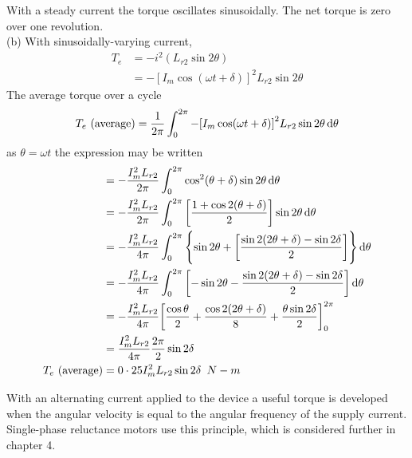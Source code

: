 \documentclass[a4paper,numbers=noenddot,12pt]{scrbook}
\begin{document}
With a steady current the torque oscillates sinusoidally. The net torque is zero over one revolution.\\
(b) With sinusoidally-varying current,
\begin{align*}
    T_e & = -i^2 (L_{r2} \sin 2 \theta) \\
    & = -{[I_m \cos (\omega t + \delta)]}^2 L_{r2} \sin 2 \theta
\end{align*}
The average torque over a cycle
\begin{equation}
    T_e\ (\text{average}) = \dfrac{1}{2 \pi} \int_0^{2 \pi} - {[I_m \cos (\omega t + \delta)]}^2 L_{r2} \sin 2\theta \dif \theta
    \label{eq:Eq3.44}
\end{equation}
as $\theta = \omega t$ the expression may be written
\begin{align}
    & = -\dfrac{I_m^2 L_{r2}}{2 \pi} \int_0^{2 \pi} \cos^2(\theta + \delta) \sin 2 \theta \dif \theta \nonumber \\
    & = -\dfrac{I_m^2 L_{r2}}{2 \pi} \int_0^{2 \pi} \left[\dfrac{1 + \cos 2 (\theta + \delta)}{2} \right] \sin 2 \theta \dif \theta \nonumber \\
    & = -\dfrac{I_m^2 L_{r2}}{4 \pi} \int_0^{2 \pi} \left\{\sin 2 \theta +  \left[\dfrac{\sin 2 (2 \theta + \delta) - \sin 2 \delta}{2} \right] \right\} \dif \theta \nonumber \\
    & = -\dfrac{I_m^2 L_{r2}}{4 \pi} \int_0^{2 \pi} \left[ -\sin 2 \theta - \dfrac{\sin 2 (2 \theta + \delta) - \sin 2 \delta}{2} \right] \dif \theta \nonumber \\
    & = -\dfrac{I_m^2 L_{r2}}{4 \pi} {\left[ \dfrac{\cos  \theta}{2} + \dfrac{\cos 2 (2 \theta +\delta)}{8} + \dfrac{\theta \sin 2 \delta}{2} \right]}_0^{2 \pi} \nonumber \\
    & =\dfrac{I_m^2 L_{r2}}{4 \pi} \dfrac{2 \pi}{2} \sin 2 \delta \nonumber \\
    T_e\ (\text{average}) & = 0 \cdot 25 I_m^2 L_{r2}\sin 2 \delta \enspace N - m
\end{align}

With an alternating current applied to the device a useful torque is developed when the angular velocity is equal to the angular frequency of the supply current. Single-phase reluctance motors use this principle, which is considered further in chapter 4.
\end{document}
